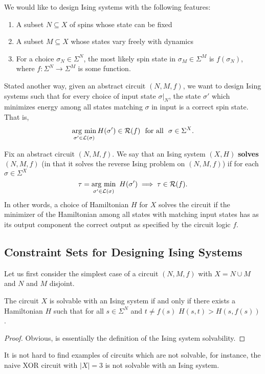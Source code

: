 \documentclass{article}
\begin{document}
We would like to design Ising systems with the following features:
\begin{enumerate}[(1)]
  \item A subset $N \subseteq X$ of spins whose state can be fixed
  \item A subset $M \subseteq X$ whose states vary freely with dynamics
  \item For a choice $\sigma_N \in \Sigma^N$, the most likely spin state in $\sigma_M \in \Sigma^M$ is $f(\sigma_N)$, where $f: \Sigma^N \to \Sigma^M$ is some function.
\end{enumerate}
Stated another way, given an abstract circuit $(N,M,f)$, we want to design Ising systems such that for every choice of input state $\sigma|_N$, the state $\sigma'$ which minimizes energy among all states matching $\sigma$ in input is a correct spin state. That is,
\begin{align*}
  \operatorname*{arg ~ min}_{\sigma' \in \mathcal{L}(\sigma)} H(\sigma') \in \mathcal{R}(f) ~ \text{ for all } ~ \sigma \in \Sigma^X.
\end{align*}

\begin{defn}\label{defn:solves-ising-circuit}
  Fix an abstract circuit $(N, M, f)$. We say that an Ising system $(X, H)$ \textbf{solves} $(N, M, f)$ (in that it solves the reverse Ising problem on $(N,M,f)$) if for each $\sigma \in \Sigma^X$ 
  \begin{align*}
    \tau = \operatorname*{arg ~ min}_{\sigma' \in \mathcal{L}(\sigma)} ~H(\sigma') \implies \tau \in \mathcal{R}(f).
  \end{align*}
  In other words, a choice of Hamiltonian $H$ for $X$ solves the circuit if the minimizer of the Hamiltonian among all states with matching input states has as its output component the correct output as specified by the circuit logic $f$.
\end{defn}

\subsection{Constraint Sets for Designing Ising Systems}
Let us first consider the simplest case of a circuit $(N, M, f)$ with $X = N \cup M$ and $N$ and $M$ disjoint.
\begin{lem}\label{lem:original-constraint-set}
  The circuit $X$ is solvable with an Ising system if and only if there exists a Hamiltonian $H$ such that for all $s\in \Sigma^N$ and $t \neq f(s)$ $H(s,t) > H(s,f(s))$.
\end{lem}
\begin{proof}
  Obvious, is essentially the definition of the Ising system solvability.
\end{proof}
It is not hard to find examples of circuits which are not solvable, for instance, the naive XOR circuit with $|X| = 3$ is not solvable with an Ising system.
\end{document}
